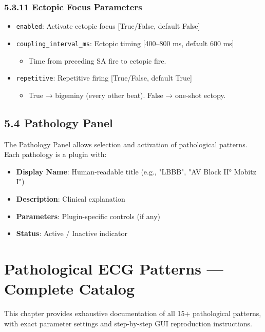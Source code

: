 \documentclass[12pt,oneside,a4paper]{book}
\newcommand{\code}[1]{\texttt{#1}}
\begin{document}
\subsection{5.3.11 Ectopic Focus Parameters}

\begin{itemize}
  \item \code{enabled}: Activate ectopic focus [True/False, default False]
  \item \code{coupling\_interval\_ms}: Ectopic timing [400--800 ms, default 600 ms]
    \begin{itemize}
      \item Time from preceding SA fire to ectopic fire.
    \end{itemize}
  \item \code{repetitive}: Repetitive firing [True/False, default True]
    \begin{itemize}
      \item True → bigeminy (every other beat). False → one-shot ectopy.
    \end{itemize}
\end{itemize}

\section{5.4 Pathology Panel}

The Pathology Panel allows selection and activation of pathological patterns. Each pathology is a plugin with:

\begin{itemize}
  \item \textbf{Display Name}: Human-readable title (e.g., "LBBB", "AV Block II° Mobitz I")
  \item \textbf{Description}: Clinical explanation
  \item \textbf{Parameters}: Plugin-specific controls (if any)
  \item \textbf{Status}: Active / Inactive indicator
\end{itemize}

\chapter{Pathological ECG Patterns — Complete Catalog}

This chapter provides exhaustive documentation of all 15+ pathological patterns, with exact parameter settings and step-by-step GUI reproduction instructions.
\end{document}
